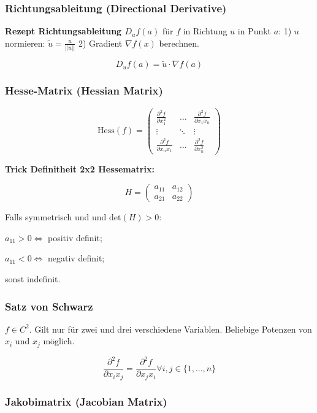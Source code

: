 \subsubsection{Richtungsableitung (Directional Derivative)}

\textbf{Rezept Richtungsableitung $D_u f(a)$} für $f$ in Richtung $u$ in Punkt $a$: 1) $u$ normieren: $\tilde{u} = \frac{u}{||u||}$ 2) Gradient $\nabla f(x)$ berechnen.

\[
    D_u f(a) = \tilde{u} \cdot \nabla f(a)
\]

\subsubsection{Hesse-Matrix (Hessian Matrix)}    

\[
    \text{Hess}(f) =
        \begin{pmatrix}
            \frac{\partial^2 f}{\partial x_1^2}&\hdots&\frac{\partial^2 f}{\partial x_1 x_n}\\
            \vdots&\ddots&\vdots\\
            \frac{\partial^2 f}{\partial x_n x_1}&\hdots&\frac{\partial^2 f}{\partial x_n^2}
        \end{pmatrix}
\]

\textbf{Trick Definitheit 2x2 Hessematrix:}

\[
    H =
        \begin{pmatrix}
            a_{11} & a_{12}\\
            a_{21} & a_{22}
        \end{pmatrix}
\]

Falls symmetrisch und und $\text{det}(H) > 0$:

$a_{11} > 0 \iff$ positiv definit;

$a_{11} < 0 \iff$ negativ definit;

sonst indefinit.

\subsubsection{Satz von Schwarz}

$f \in C^2$. Gilt nur für zwei und drei verschiedene Variablen. Beliebige Potenzen von $x_i$ und $x_j$ möglich.

\[
    \frac{\partial^2 f}{\partial x_i x_j} = \frac{\partial^2 f}{\partial x_j x_i} \forall i, j \in \{1, ..., n\}
\]

\subsubsection{Jakobimatrix (Jacobian Matrix)}


